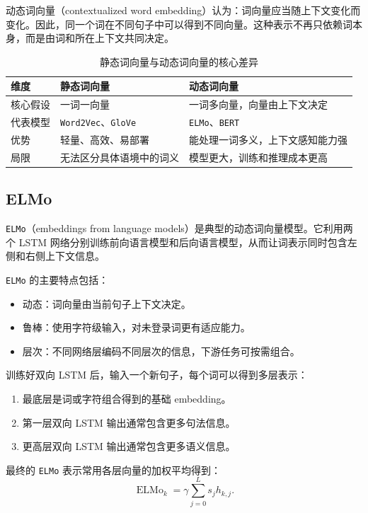 动态词向量（contextualized word embedding）认为：词向量应当随上下文变化而变化。因此，同一个词在不同句子中可以得到不同向量。这种表示不再只依赖词本身，而是由词和所在上下文共同决定。

\begin{table}[H]
\centering
\small
\begin{tabular}{|p{}|p{}|p{}|}
\hline
维度 & 静态词向量 & 动态词向量 \\ \hline
核心假设 & 一词一向量 & 一词多向量，向量由上下文决定 \\ \hline
代表模型 & \texttt{Word2Vec}、\texttt{GloVe} & \texttt{ELMo}、\texttt{BERT} \\ \hline
优势 & 轻量、高效、易部署 & 能处理一词多义，上下文感知能力强 \\ \hline
局限 & 无法区分具体语境中的词义 & 模型更大，训练和推理成本更高 \\ \hline
\end{tabular}
\caption{静态词向量与动态词向量的核心差异}
\end{table}

\subsection{ELMo}

\texttt{ELMo}（embeddings from language models）是典型的动态词向量模型。它利用两个 LSTM 网络分别训练前向语言模型和后向语言模型，从而让词表示同时包含左侧和右侧上下文信息。

\texttt{ELMo} 的主要特点包括：
\begin{itemize}
  \item 动态：词向量由当前句子上下文决定。
  \item 鲁棒：使用字符级输入，对未登录词更有适应能力。
  \item 层次：不同网络层编码不同层次的信息，下游任务可按需组合。
\end{itemize}

训练好双向 LSTM 后，输入一个新句子，每个词可以得到多层表示：
\begin{enumerate}
  \item 最底层是词或字符组合得到的基础 embedding。
  \item 第一层双向 LSTM 输出通常包含更多句法信息。
  \item 更高层双向 LSTM 输出通常包含更多语义信息。
\end{enumerate}

最终的 \texttt{ELMo} 表示常用各层向量的加权平均得到：
\[
  \operatorname{ELMo}_k = \gamma \sum_{j=0}^L s_j h_{k,j}.
\]

